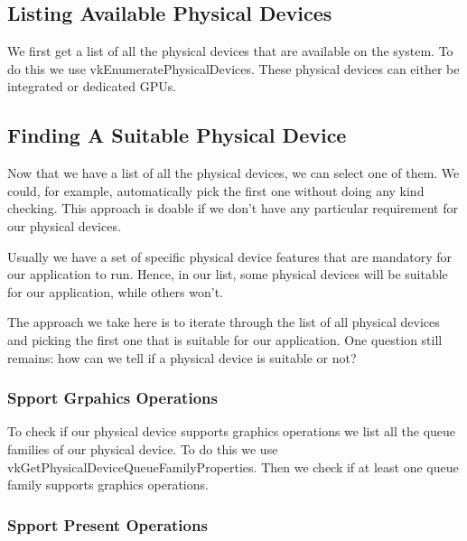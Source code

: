 \subsection{Listing Available Physical Devices}

We first get a list of all the physical devices that are available on the
system.
To do this we use vkEnumeratePhysicalDevices.
These physical devices can either be integrated or dedicated GPUs.

\subsection{Finding A Suitable Physical Device}

Now that we have a list of all the physical devices, we can select one of them.
We could, for example, automatically pick the first one without doing any kind
checking.
This approach is doable if we don't have any particular requirement for our
physical devices.

Usually we have a set of specific physical device features that are mandatory
for our application to run.
Hence, in our list, some physical devices will be suitable for our application, while
others won't.

The approach we take here is to iterate through the list of all physical devices and
picking the first one that is suitable for our application.
One question still remains: how can we tell if a physical device is suitable or not?

\subsubsection{Spport Grpahics Operations}

To check if our physical device supports graphics operations we list all
the queue families of our physical device.
To do this we use vkGetPhysicalDeviceQueueFamilyProperties.
Then we check if at least one queue family supports graphics operations.

\begin{minipage}{\linewidth}{\noindent}
    
\end{minipage}

\subsubsection{Spport Present Operations}

